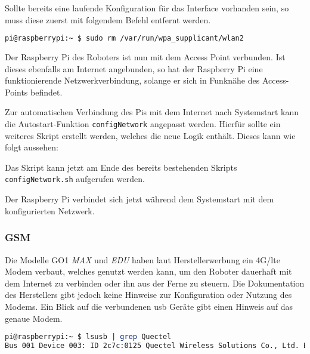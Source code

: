 \noindent Sollte bereits eine laufende Konfiguration für das Interface vorhanden sein, so muss diese zuerst mit folgendem
Befehl entfernt werden.

\begin{lstlisting}[language=Bash]
pi@raspberrypi:~ $ sudo rm /var/run/wpa_supplicant/wlan2
\end{lstlisting}

Der Raspberry Pi des Roboters ist nun mit dem Access Point verbunden.
Ist dieses ebenfalls am Internet angebunden, so hat der Raspberry Pi eine funktionierende Netzwerkverbindung,
solange er sich in Funknähe des Access-Points befindet.


Zur automatischen Verbindung des Pis mit dem Internet nach Systemstart kann die Autostart-Funktion \texttt{configNetwork}
angepasst werden.
Hierfür sollte ein weiteres Skript erstellt werden, welches die neue Logik enthält.
Dieses kann wie folgt aussehen:



\noindent Das Skript kann jetzt am Ende des bereits bestehenden Skripts \texttt{configNetwork.sh} aufgerufen werden.



\noindent Der Raspberry Pi verbindet sich jetzt während dem Systemstart mit dem konfigurierten Netzwerk.

\subsubsection{GSM}
\label{subsubsec:gsm}

Die Modelle GO1 \emph{MAX} und \emph{EDU} haben laut Herstellerwerbung ein 4G/\gls{lte} Modem verbaut, welches genutzt werden
kann, um den Roboter dauerhaft mit dem Internet zu verbinden oder ihn aus der Ferne zu steuern.
Die Dokumentation des Herstellers gibt jedoch keine Hinweise zur Konfiguration oder Nutzung des Modems.
Ein Blick auf die verbundenen \gls{usb} Geräte gibt einen Hinweis auf das genaue Modem.

\begin{lstlisting}[language=Bash]
pi@raspberrypi:~ $ lsusb | grep Quectel
Bus 001 Device 003: ID 2c7c:0125 Quectel Wireless Solutions Co., Ltd. EC25 LTE modem
\end{lstlisting}

